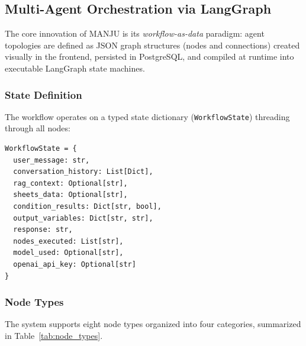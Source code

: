 \documentclass[10pt, a4paper, twocolumn]{article}
\begin{document}
\subsection{Multi-Agent Orchestration via LangGraph}
\label{sec:orchestration}

The core innovation of MANJU is its \textit{workflow-as-data} paradigm: agent topologies are defined as JSON graph structures (nodes and connections) created visually in the frontend, persisted in PostgreSQL, and compiled at runtime into executable LangGraph state machines.

\subsubsection{State Definition}
The workflow operates on a typed state dictionary (\texttt{WorkflowState}) threading through all nodes:

\begin{small}
\begin{verbatim}
WorkflowState = {
  user_message: str,
  conversation_history: List[Dict],
  rag_context: Optional[str],
  sheets_data: Optional[str],
  condition_results: Dict[str, bool],
  output_variables: Dict[str, str],
  response: str,
  nodes_executed: List[str],
  model_used: Optional[str],
  openai_api_key: Optional[str]
}
\end{verbatim}
\end{small}

\subsubsection{Node Types}
The system supports eight node types organized into four categories, summarized in Table~\ref{tab:node_types}.
\end{document}
